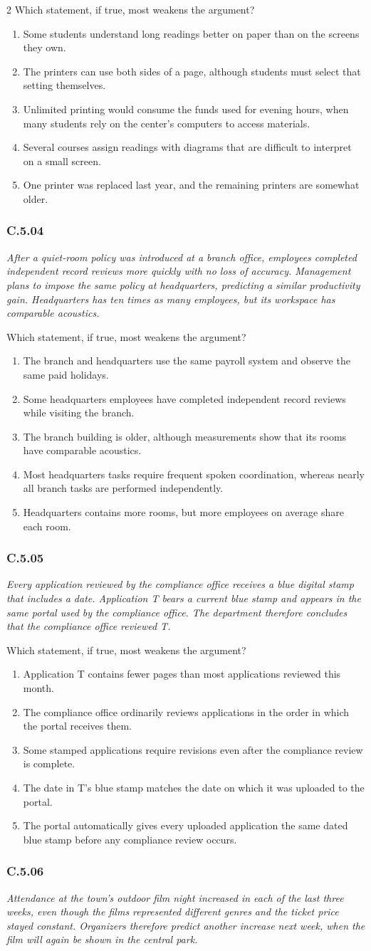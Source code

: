 \documentclass[10pt]{extarticle}
\newcommand{\choice}[1]{\item #1}
\newcommand{\bankitem}[1]{\subsubsection*{#1}}
\begin{document}
\begin{multicols}{2}
Which statement, if true, most weakens the argument?
\begin{enumerate}[label=(\alph*)]
  \choice{Some students understand long readings better on paper than on the screens they own.}
  \choice{The printers can use both sides of a page, although students must select that setting themselves.}
  \choice{Unlimited printing would consume the funds used for evening hours, when many students rely on the center's computers to access materials.}
  \choice{Several courses assign readings with diagrams that are difficult to interpret on a small screen.}
  \choice{One printer was replaced last year, and the remaining printers are somewhat older.}
\end{enumerate}
\bankitem{C.5.04}
\emph{After a quiet-room policy was introduced at a branch office, employees completed independent record reviews more quickly with no loss of accuracy. Management plans to impose the same policy at headquarters, predicting a similar productivity gain. Headquarters has ten times as many employees, but its workspace has comparable acoustics.}

Which statement, if true, most weakens the argument?
\begin{enumerate}[label=(\alph*)]
  \choice{The branch and headquarters use the same payroll system and observe the same paid holidays.}
  \choice{Some headquarters employees have completed independent record reviews while visiting the branch.}
  \choice{The branch building is older, although measurements show that its rooms have comparable acoustics.}
  \choice{Most headquarters tasks require frequent spoken coordination, whereas nearly all branch tasks are performed independently.}
  \choice{Headquarters contains more rooms, but more employees on average share each room.}
\end{enumerate}
\bankitem{C.5.05}
\emph{Every application reviewed by the compliance office receives a blue digital stamp that includes a date. Application T bears a current blue stamp and appears in the same portal used by the compliance office. The department therefore concludes that the compliance office reviewed T.}

Which statement, if true, most weakens the argument?
\begin{enumerate}[label=(\alph*)]
  \choice{Application T contains fewer pages than most applications reviewed this month.}
  \choice{The compliance office ordinarily reviews applications in the order in which the portal receives them.}
  \choice{Some stamped applications require revisions even after the compliance review is complete.}
  \choice{The date in T's blue stamp matches the date on which it was uploaded to the portal.}
  \choice{The portal automatically gives every uploaded application the same dated blue stamp before any compliance review occurs.}
\end{enumerate}
\bankitem{C.5.06}
\emph{Attendance at the town's outdoor film night increased in each of the last three weeks, even though the films represented different genres and the ticket price stayed constant. Organizers therefore predict another increase next week, when the film will again be shown in the central park.}


\end{multicols}
\end{document}
